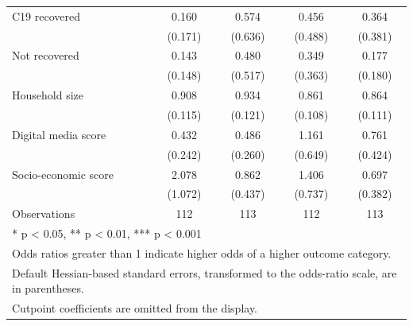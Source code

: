 \begin{table}
\begin{tabular}[t]{lcccc}
C19 recovered & 0.160 & 0.574 & 0.456 & 0.364\\
 & (0.171) & (0.636) & (0.488) & (0.381)\\
Not recovered & 0.143 & 0.480 & 0.349 & 0.177\\
 & (0.148) & (0.517) & (0.363) & (0.180)\\
Household size & 0.908 & 0.934 & 0.861 & 0.864\\
 & (0.115) & (0.121) & (0.108) & (0.111)\\
Digital media score & 0.432 & 0.486 & 1.161 & 0.761\\
 & (0.242) & (0.260) & (0.649) & (0.424)\\
Socio-economic score & 2.078 & 0.862 & 1.406 & 0.697\\
 & (1.072) & (0.437) & (0.737) & (0.382)\\
Observations & 112 & 113 & 112 & 113\\
\bottomrule
\multicolumn{5}{l}{\rule{0pt}{1em}* p < 0.05, ** p < 0.01, *** p < 0.001}\\
\multicolumn{5}{l}{\rule{0pt}{1em}Odds ratios greater than 1 indicate higher odds of a higher outcome category.}\\
\multicolumn{5}{l}{\rule{0pt}{1em}Default Hessian-based standard errors, transformed to the odds-ratio scale, are in parentheses.}\\
\multicolumn{5}{l}{\rule{0pt}{1em}Cutpoint coefficients are omitted from the display.}\\
\end{tabular}
\end{table}
